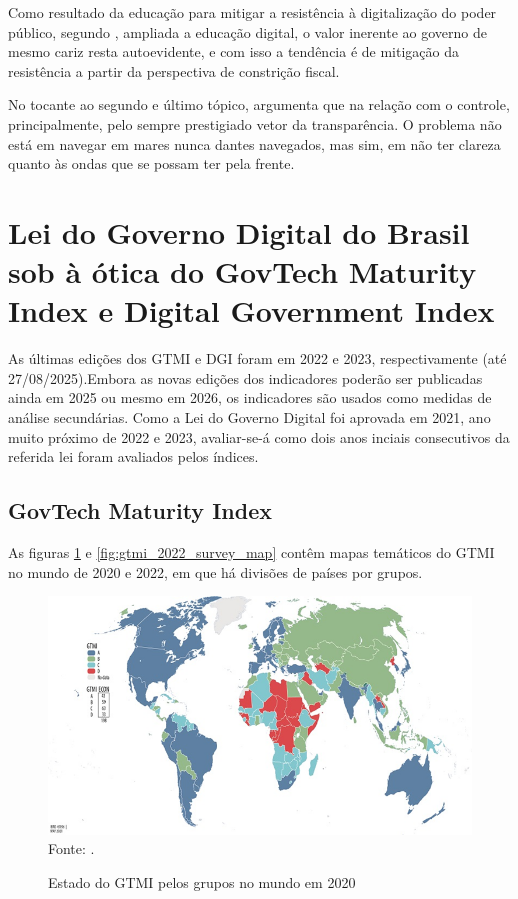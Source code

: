 Como resultado da educação para mitigar a resistência à digitalização do poder público, segundo \cite{do2022governo}, ampliada a educação digital, o valor inerente ao governo de mesmo cariz resta autoevidente, e com isso a tendência é de mitigação da resistência a partir da perspectiva de constrição fiscal.

No tocante ao segundo e último tópico, \cite{do2022governo} argumenta que na relação com o controle, principalmente, pelo sempre prestigiado vetor da transparência. O problema não está em navegar em mares nunca dantes navegados, mas sim, em não ter clareza quanto às ondas que se possam ter pela frente.

\section{Lei do Governo Digital do Brasil sob à ótica do GovTech Maturity Index e Digital Government Index}

As últimas edições dos GTMI e DGI foram em 2022 e 2023, respectivamente (até 27/08/2025).Embora as novas edições dos indicadores poderão ser publicadas ainda em 2025 ou mesmo em 2026, os indicadores são usados como medidas de análise secundárias. Como a Lei do Governo Digital foi aprovada em 2021, ano muito próximo de 2022 e 2023, avaliar-se-á como dois anos inciais consecutivos da referida lei foram avaliados pelos índices.

\subsection{GovTech Maturity Index}

As figuras \ref{fig:gtmi_2020_survey_map} e \ref{fig:gtmi_2022_survey_map} contêm mapas temáticos do GTMI no mundo de 2020 e 2022, em que há divisões de países por grupos.

\begin{figure}[H]
	\centering
	\caption{Estado do GTMI pelos grupos no mundo em 2020}
	\includegraphics[width=1\linewidth]{figuras/gtmi_2020_survey_map}
	\label{fig:gtmi_2020_survey_map}
	\footnotesize{Fonte: \cite{gtmi_2020_findings}.}
\end{figure}

